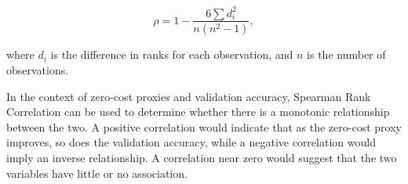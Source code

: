 \begin{equation} 
    \rho = 1 - \frac{6 \sum d_i^2}{n(n^2 - 1)}, 
    \label{eq:spearman}
 \end{equation}

where $d_i$ is the difference in ranks for each observation, and $n$ is the number of observations.

In the context of zero-cost proxies and validation accuracy, Spearman Rank Correlation can be used to determine whether there is a monotonic relationship between the two. A positive correlation would indicate that as the zero-cost proxy improves, so does the validation accuracy, while a negative correlation would imply an inverse relationship. A correlation near zero would suggest that the two variables have little or no association. 



